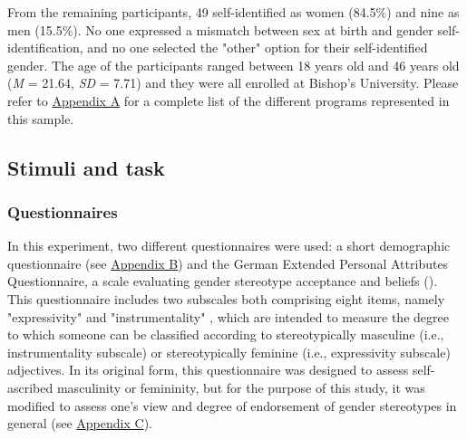 \documentclass[serif, authordate, twocolumn, empirical]{jote-article}
\begin{document}
From the remaining participants, 49 self-identified as women (84.5$\%$) and nine as men (15.5$\%$). No one expressed a mismatch between sex at birth and gender self-identification, and no one selected the "other" option for their self-identified gender. The age of the participants ranged between 18 years old and 46 years old (\textit{M }= 21.64, \textit{SD }= 7.71) and they were all enrolled at Bishop’s University. Please refer to \hyperlink{A}{Appendix A} for a complete list of the different programs represented in this sample.

\subsection*{Stimuli and task}
\subsubsection*{Questionnaires} In this experiment, two different questionnaires were used: a short demographic questionnaire (see \hyperlink{B}{Appendix B}) and the German Extended Personal Attributes Questionnaire, a scale evaluating gender stereotype acceptance and beliefs (\cite{RungeFreyGollwitzerHelmreichSpence1981}). This questionnaire includes two subscales both comprising eight items, namely "expressivity" and "instrumentality" , which are intended to measure the degree to which someone can be classified according to stereotypically masculine (i.e., instrumentality subscale) or stereotypically feminine (i.e., expressivity subscale) adjectives. In its original form, this questionnaire was designed to assess self-ascribed masculinity or femininity, but for the purpose of this study, it was modified to assess one’s view and degree of endorsement of gender stereotypes in general (see \hyperlink{C}{Appendix C}). 
\end{document}
